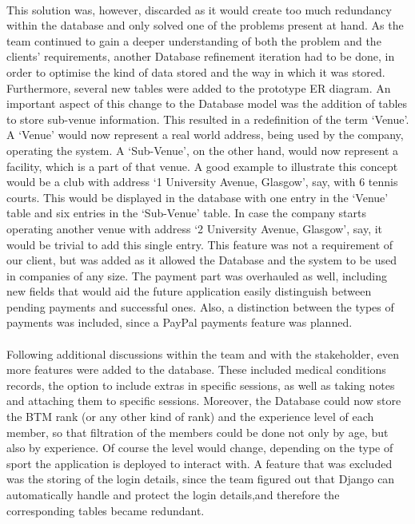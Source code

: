 \documentclass{l3proj}
\begin{document}
\\This solution was, however, discarded as it would create too much redundancy within the database and only solved one of the problems present at hand. As the team continued to gain a deeper understanding of both the problem and the clients' requirements, another Database refinement iteration had to be done, in order to optimise the kind of data stored and the way in which it was stored. Furthermore, several new tables were added to the prototype ER diagram. An important aspect of this change to the Database model was the addition of tables to store sub-venue information. This resulted in a redefinition of the term `Venue'. A `Venue' would now represent a real world address, being used by the company, operating the system. A `Sub-Venue', on the other hand, would now represent a facility, which is a part of that venue. A good example to illustrate this concept would be a club with address `1 University Avenue, Glasgow', say, with 6 tennis courts. This would be displayed in the database with one entry in the `Venue' table and six entries in the `Sub-Venue' table. In case the company starts operating another venue with address `2 University Avenue, Glasgow', say, it would be trivial to add this single entry. This feature was not a requirement of our client, but was added as it allowed the Database and the system to be used in companies of any size. The payment part was overhauled as well, including new fields that would aid the future application easily distinguish between pending payments and successful ones. Also, a distinction between the types of payments was included, since a PayPal payments feature was planned.\\
\\Following additional discussions within the team and with the stakeholder, even more features were added to the database. These included medical conditions records, the option to include extras in specific sessions, as well as taking notes and attaching them to specific sessions. Moreover, the Database could now store the BTM rank (or any other kind of rank) and the experience level of each member, so that filtration of the members could be done not only by age, but also by experience.  Of course the level would change, depending on the type of sport the application is deployed to interact with. A feature that was excluded was the storing of the login details, since the team figured out that Django can automatically handle and protect the login details,and therefore the corresponding tables became redundant.\\
\end{document}
